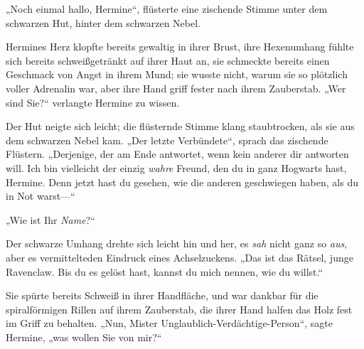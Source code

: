 „Noch einmal hallo, Hermine“, flüsterte eine zischende Stimme unter dem schwarzen Hut, hinter dem schwarzen Nebel.

Hermines Herz klopfte bereits gewaltig in ihrer Brust, ihre Hexenumhang fühlte sich bereits schweißgetränkt auf ihrer Haut an, sie schmeckte bereits einen Geschmack von Angst in ihrem Mund; sie wusste nicht, warum sie so plötzlich voller Adrenalin war, aber ihre Hand griff fester nach ihrem Zauberstab. „Wer sind Sie?“ verlangte Hermine zu wissen.

Der Hut neigte sich leicht; die flüsternde Stimme klang staubtrocken, als sie aus dem schwarzen Nebel kam. „Der letzte Verbündete“, sprach das zischende Flüstern. „Derjenige, der am Ende antwortet, wenn kein anderer dir antworten will. Ich bin vielleicht der einzig \emph{wahre} Freund, den du in ganz Hogwarts hast, Hermine. Denn jetzt hast du gesehen, wie die anderen geschwiegen haben, als du in Not warst—“

„Wie ist Ihr \emph{Name}?“

Der schwarze Umhang drehte sich leicht hin und her, es \emph{sah} nicht ganz so \emph{aus}, aber es vermittelteden Eindruck eines Achselzuckens. „Das ist das Rätsel, junge Ravenclaw. Bis du es gelöst hast, kannst du mich nennen, wie du willst.“

Sie spürte bereits Schweiß in ihrer Handfläche, und war dankbar für die spiralförmigen Rillen auf ihrem Zauberstab, die ihrer Hand halfen das Holz fest im Griff zu behalten. „Nun, Mister Unglaublich-Verdächtige-Person“, sagte Hermine, „was wollen Sie von mir?“

